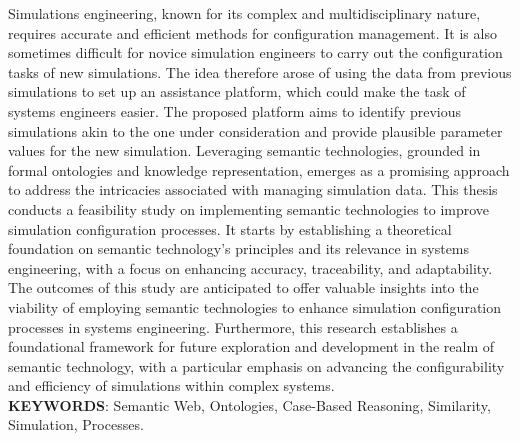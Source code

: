 Simulations engineering, known for its complex and multidisciplinary nature, requires accurate and efficient methods for configuration management. It is also sometimes difficult for novice simulation engineers to carry out the configuration tasks of new simulations. The idea therefore arose of using the data from previous simulations to set up an assistance platform, which could make the task of systems engineers easier. The proposed platform aims to identify previous simulations akin to the one under consideration and provide plausible parameter values for the new simulation. Leveraging semantic technologies, grounded in formal ontologies and knowledge representation, emerges as a promising approach to address the intricacies associated with managing simulation data. This thesis conducts a feasibility study on implementing semantic technologies to improve simulation configuration processes. It starts by establishing a theoretical foundation on semantic technology's principles and its relevance in systems engineering, with a focus on enhancing accuracy, traceability, and adaptability. The outcomes of this study are anticipated to offer valuable insights into the viability of employing semantic technologies to enhance simulation configuration processes in systems engineering. Furthermore, this research establishes a foundational framework for future exploration and development in the realm of semantic technology, with a particular emphasis on advancing the configurability and efficiency of simulations within complex systems.\\

\textbf{KEYWORDS}: Semantic Web, Ontologies, Case-Based Reasoning, Similarity, Simulation, Processes.

